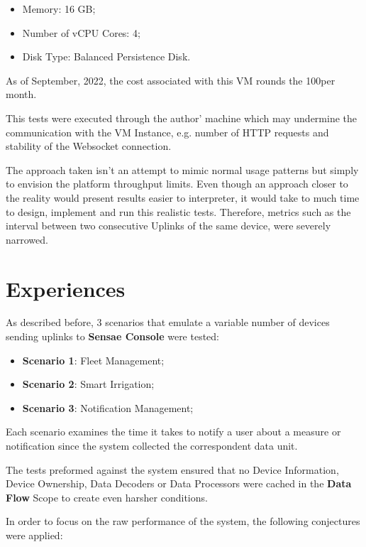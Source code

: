 \begin{itemize}
    \item Memory: 16 GB;
    \item Number of vCPU Cores: 4;
    \item Disk Type: Balanced Persistence Disk.
\end{itemize}

As of September, 2022, the cost associated with this \gls{VM} rounds the 100\texteuro per month.

This tests were executed through the author' machine which may undermine the communication with the \gls{VM} Instance, e.g. number of HTTP requests and stability of the Websocket connection.

The approach taken isn't an attempt to mimic normal usage patterns but simply to envision the platform throughput limits. Even though an approach closer to the reality would present results easier to interpreter, it would take to much time to design, implement and run this realistic tests. Therefore, metrics such as the interval between two consecutive Uplinks of the same device, were severely narrowed.

\section{Experiences}
\label{sec:evaluation:experiences}

As described before, 3 scenarios that emulate a variable number of devices sending uplinks to \textbf{Sensae Console} were tested:

\begin{itemize}
    \item \textbf{Scenario 1}: Fleet Management;
    \item \textbf{Scenario 2}: Smart Irrigation;
    \item \textbf{Scenario 3}: Notification Management;
\end{itemize}

Each scenario examines the time it takes to notify a user about a measure or notification since the system collected the correspondent data unit.

The tests preformed against the system ensured that no Device Information, Device Ownership, Data Decoders or Data Processors were cached in the \textbf{Data Flow} Scope to create even harsher conditions.

In order to focus on the raw performance of the system, the following conjectures were applied:

